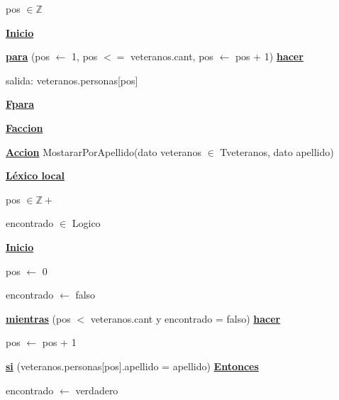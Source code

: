 \documentclass{article}
\begin{document}
            \hspace{12mm}pos $\in \mathbb{Z}$

        \hspace{8mm}\underline{\textbf{Inicio}}

            \hspace{12mm}\underline{\textbf{para}} (pos $\leftarrow$ 1, pos $<=$ veteranos.cant, pos $\leftarrow$ pos + 1)
            \underline{\textbf{hacer}}

                \hspace{16mm}salida: veteranos.personas[pos]

            \hspace{12mm}\underline{\textbf{Fpara}}

    \hspace{4mm}\underline{\textbf{Faccion}}

    \vspace{4mm}

    \hspace{4mm}\underline{\textbf{Accion}} MostararPorApellido(dato veteranos $\in$ Tveteranos, dato apellido)

        \hspace{8mm}\underline{\textbf{Léxico local}}

            \hspace{12mm}pos $\in \mathbb{Z}+$

            \hspace{12mm}encontrado $\in$ Logico

        \hspace{8mm}\underline{\textbf{Inicio}}

            \hspace{12mm} pos $\leftarrow$ 0

            \hspace{12mm} encontrado $\leftarrow$ falso

            \hspace{12mm}\underline{\textbf{mientras}} (pos $<$ veteranos.cant y encontrado = falso) \underline{\textbf{hacer}}

                \hspace{16mm}pos $\leftarrow$ pos + 1

                \hspace{16mm}\underline{\textbf{si}} (veteranos.personas[pos].apellido = apellido) \underline{\textbf{Entonces}}

                    \hspace{20mm}encontrado $\leftarrow$ verdadero
\end{document}
